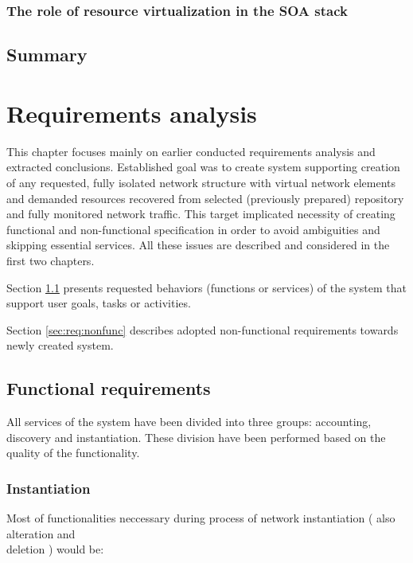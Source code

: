 \documentclass[11pt]{book}
\begin{document}
      \subsection{The role of resource virtualization in the SOA stack}


    \section*{Summary}


  \chapter{Requirements analysis}

    This chapter focuses mainly on earlier conducted requirements analysis and extracted conclusions. Established goal
    was to create system supporting creation of any requested, fully isolated network structure with virtual network
    elements and demanded resources recovered from selected (previously prepared) repository and fully monitored network
    traffic. This target implicated necessity of creating functional and non-functional specification in order to avoid
    ambiguities and skipping essential services. All these issues are described and considered in the first two
    chapters.

    Section \ref{sec:req:func} presents requested behaviors (functions or services) of the system that support user
    goals, tasks or activities.

    Section \ref{sec:req:nonfunc} describes adopted non-functional requirements towards newly created system.


    \section{Functional requirements}
	
		\label{sec:req:func}
		
		All services of the system have been divided into three groups: accounting, discovery and instantiation.
                These division have been performed based on the quality of the functionality.  

      \subsection{Instantiation}
		\label{sec:req:func:inst}
	  
		Most of functionalities neccessary during process of network instantiation ( also alteration and \\ deletion ) would be:
		
\end{document}
